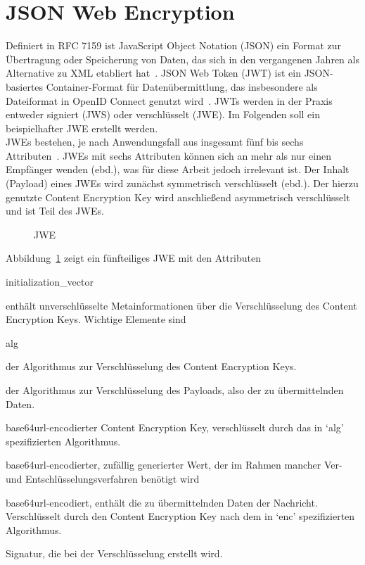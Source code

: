 \section{JSON Web Encryption}\label{ch:JWE}
Definiert in RFC 7159 ist JavaScript Object Notation (JSON) ein Format
zur Übertragung oder Speicherung von Daten, das sich in den vergangenen Jahren
als Alternative zu XML etabliert hat~.
JSON Web Token (JWT) ist ein JSON-basiertes Container-Format für
Datenübermittlung, das insbesondere als Dateiformat in OpenID Connect genutzt
wird~. JWTs werden in der Praxis
entweder signiert (JWS) oder verschlüsselt (JWE).
Im Folgenden soll ein beispielhafter JWE erstellt werden.
\\
JWEs bestehen, je nach Anwendungsfall aus insgesamt fünf bis sechs
Attributen~.
JWEs mit sechs Attributen können sich an mehr als nur einen Empfänger wenden
(ebd.), was für diese Arbeit jedoch irrelevant ist. Der Inhalt (Payload) eines
JWEs wird zunächst symmetrisch verschlüsselt (ebd.). Der hierzu genutzte Content
Encryption Key wird anschließend asymmetrisch verschlüsselt und ist Teil des
JWEs.
\begin{figure}[h]
    \scalebox{.8}{
        
    }
    \caption{JWE}\label{ls: JWE}
\end{figure} \noindent
\FloatBarrier{} \noindent
Abbildung~\ref{ls: JWE} zeigt ein fünfteiliges JWE mit den Attributen
\begin{labeling}{initialization\_vector}
    \item [header] enthält unverschlüsselte Metainformationen über die
    Verschlüsselung des Content Encryption Keys. Wichtige Elemente sind
    \begin{labeling}{alg}
        \item[alg] der Algorithmus zur Verschlüsselung des Content Encryption
        Keys.
        \item[enc] der Algorithmus zur Verschlüsselung des Payloads, also der zu
        übermittelnden Daten.
    \end{labeling}
    \item [encrypted\_key] base64url-encodierter Content Encryption Key,
    verschlüsselt durch das in `alg' spezifizierten Algorithmus.
    \item [initialization\_vector] base64url-encodierter, zufällig generierter
    Wert, der im Rahmen mancher Ver- und Entschlüsselungsverfahren benötigt wird
    \item[ciphertext] base64url-encodiert, enthält die zu übermittelnden Daten der
    Nachricht. Verschlüsselt durch den Content Encryption Key nach dem in `enc'
    spezifizierten Algorithmus.
    \item[tag] Signatur, die bei der Verschlüsselung erstellt wird.
\end{labeling}
